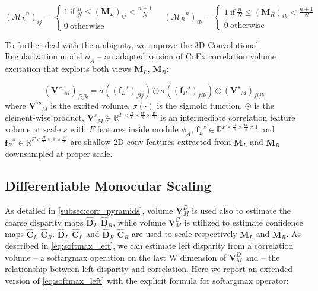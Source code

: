 \small\begin{equation}
    ({\mathcal{M}_L}^n)_{ij} = \begin{cases}
        1\ \text{if}\ \frac{n}{N} \leq (\mathbf{M}_L)_{ij} < \frac{n+1}{N}\\
        0\ \text{otherwise}
    \end{cases} \quad ({\mathcal{M}_R}^n)_{ik} = \begin{cases}
        1\ \text{if}\ \frac{n}{N} \leq (\mathbf{M}_R)_{ik} < \frac{n+1}{N}\\
        0\ \text{otherwise}
    \end{cases}
    \label{eq:mask}
\end{equation}\normalsize

To further deal with the ambiguity, we improve the 3D Convolutional Regularization model $\phi_A$  -- an adapted version of CoEx \cite{bangunharcana2021correlate} correlation volume excitation that exploits both views $\textbf{M}_L$, $\textbf{M}_R$:

\small\begin{equation}
    ({\mathbf{V'}^s}_M)_{fijk} = \sigma\left(({{\mathbf{f}_L}^s})_{fij}\right) \odot \sigma\left(({{\mathbf{f}_R}^s})_{fik}\right) \odot ({\mathbf{V}^s}_M)_{fijk}
    \label{eq:our_coex}
\end{equation}\normalsize
where ${\mathbf{V'}^s}_M$ is the excited volume, $\sigma(\cdot)$ is the sigmoid function, $\odot$ is the element-wise product, ${\mathbf{V}^s}_M \in \mathbb{R}^{F \times \frac{H}{s} \times \frac{W}{s} \times \frac{W}{s}}$ is an intermediate correlation feature volume at scale $s$ with $F$ features inside module $\phi_A$,  ${\mathbf{f}_L}^s \in \mathbb{R}^{F \times \frac{H}{s} \times \frac{W}{s} \times 1}$ and ${\mathbf{f}_R}^s \in \mathbb{R}^{F \times \frac{H}{s} \times 1 \times \frac{W}{s}}$ are shallow 2D conv-features extracted from $\mathbf{M}_L$ and $\mathbf{M}_R$ downsampled at proper scale.

\subsection{Differentiable Monocular Scaling}
\label{subsec:diff_mono}

As detailed in \cref{subsec:corr_pyramids}, volume $\mathbf{V}^D_M$ is used also to estimate the coarse disparity maps $\hat{\mathbf{D}}_L$ $\hat{\mathbf{D}}_R$, while volume $\mathbf{V}^C_M$ is utilized to estimate confidence maps $\hat{\mathbf{C}}_L$ $\hat{\mathbf{C}}_R$.
$\hat{\mathbf{D}}_L$ $\hat{\mathbf{C}}_L$ and $\hat{\mathbf{D}}_R$ $\hat{\mathbf{C}}_R$ are used to scale respectively $\mathbf{M}_L$ and $\mathbf{M}_R$.
As described in \cref{eq:softmax_left}, we can estimate left disparity from a correlation volume  -- a softargmax operation on the last W dimension of $\mathbf{V}^D_M$ and  -- the relationship between left disparity and correlation.
Here we report an extended version of \cref{eq:softmax_left} with the explicit formula for softargmax operator:

